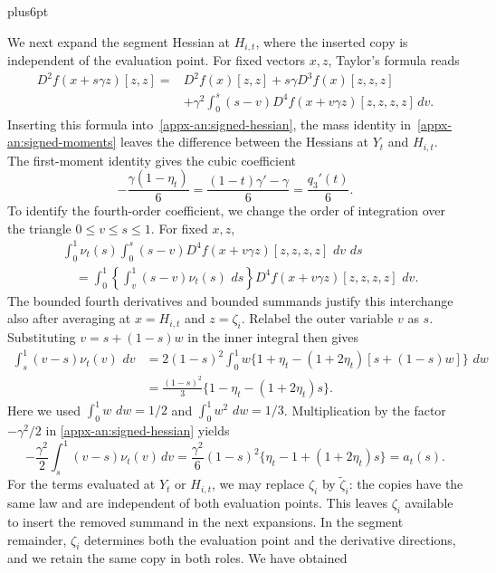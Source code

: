 \documentclass[11pt,letterpaper,twoside,leqno]{article}
\makeatletter
\theoremstyle{bookplain}
\theoremstyle{bookremark}
\renewenvironment{proof}[1][\proofname]{\par
  \pushQED{\qed}\normalfont\topsep6pt plus6pt\relax
  \trivlist\item[\hskip\labelsep\bfseries #1\@addpunct{.}]\ignorespaces
}{\popQED\endtrivlist\@endpefalse}
\newcommand{\dd}{\,d}
\makeatother
\begin{document}
\begin{proof}
We next expand the segment Hessian at \(H_{i,t}\), where the
inserted copy is independent of the evaluation point. For fixed
vectors \(x,z\), Taylor's formula reads
\[
 \begin{aligned}
 D^2f(x+s\gamma z)[z,z]
 ={}&D^2f(x)[z,z]+s\gamma D^3f(x)[z,z,z]\\
 &+\gamma^2\int_0^s(s-v)
           D^4f(x+v\gamma z)[z,z,z,z]\dd v.
 \end{aligned}
\]
Inserting this formula into~\eqref{appx-an:signed-hessian},
the mass identity in~\eqref{appx-an:signed-moments} leaves the
difference between the Hessians at \(Y_t\) and \(H_{i,t}\).
The first-moment identity gives the cubic coefficient
\[
 -\frac{\gamma(1-\eta_t)}6
 =\frac{(1-t)\gamma'-\gamma}{6}
 =\frac{q_3'(t)}6.
\]
To identify the fourth-order coefficient, we change the order of
integration over the triangle $0\le v\le s\le1$. For fixed $x,z$,
\[
 \begin{aligned}
 &\int_0^1\nu_t(s)\int_0^s(s-v)
       D^4f(x+v\gamma z)[z,z,z,z]\,\dd v\,\dd s\\
 &\quad=\int_0^1
       \left\{\int_v^1(s-v)\nu_t(s)\,\dd s\right\}
       D^4f(x+v\gamma z)[z,z,z,z]\,\dd v.
 \end{aligned}
\]
The bounded fourth derivatives and bounded summands justify this
interchange also after averaging at $x=H_{i,t}$ and $z=\zeta_i$.
Relabel the outer variable $v$ as $s$. Substituting
$v=s+(1-s)w$ in the inner integral then gives
\[
 \begin{aligned}
 \int_s^1(v-s)\nu_t(v)\,\dd v
 &=2(1-s)^2\int_0^1
       w\{1+\eta_t-(1+2\eta_t)[s+(1-s)w]\}\,\dd w\\
 &=\frac{(1-s)^2}{3}
       \{1-\eta_t-(1+2\eta_t)s\}.
 \end{aligned}
\]
Here we used $\int_0^1w\,\dd w=1/2$ and
$\int_0^1w^2\,\dd w=1/3$.
Multiplication by the factor $-\gamma^2/2$ in
\eqref{appx-an:signed-hessian} yields
\[
 -\frac{\gamma^2}{2}\int_s^1(v-s)\nu_t(v)\dd v
 =\frac{\gamma^2}{6}(1-s)^2
       \{\eta_t-1+(1+2\eta_t)s\}
 =a_t(s).
\]
For the terms evaluated at \(Y_t\) or \(H_{i,t}\), we may replace
\(\zeta_i\) by \(\widetilde\zeta_i\): the copies have the same law
and are independent of both evaluation points. This leaves
\(\zeta_i\) available to insert the removed summand in the next
expansions. In the segment remainder, $\zeta_i$ determines both
the evaluation point and the derivative directions, and we retain
the same copy in both roles. We have obtained
\begin{equation}
 \begin{aligned}

\end{aligned}
\end{equation}
\end{proof}
\end{document}
